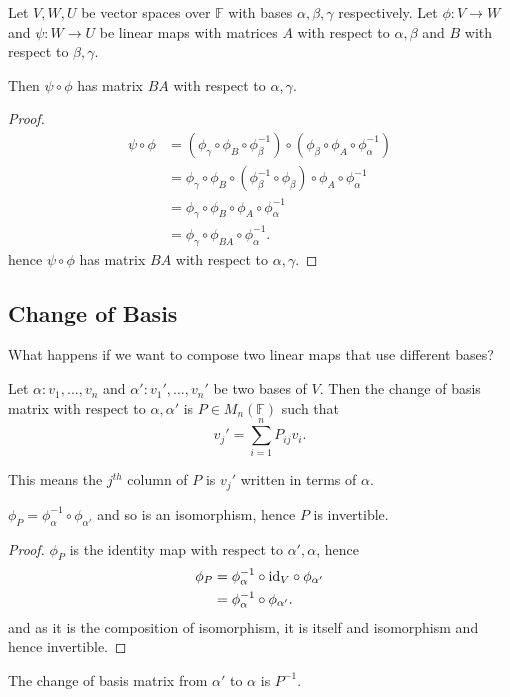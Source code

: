 \begin{prop}
    Let $V, W , U$ be vector spaces over $\mathbb{F}$ with bases $\alpha, \beta, \gamma$ respectively. Let $\phi : V \rightarrow W$ and $\psi : W \rightarrow U$ be linear maps with matrices $A$ with respect to $\alpha, \beta$ and $B$ with respect to $\beta,\gamma$.

    Then $\psi \circ \phi$ has matrix $BA$ with respect to $\alpha, \gamma$.
\end{prop}
\begin{proof}
  \begin{align*}
    \psi \circ \phi &= (\phi_\gamma \circ \phi_B \circ \phi_\beta^{-1}) \circ (\phi_\beta \circ \phi_A \circ \phi_\alpha^{-1}) \\
    &= \phi_\gamma \circ \phi_B \circ (\phi_\beta^{-1} \circ \phi_\beta) \circ \phi_A \circ \phi_\alpha^{-1} \\
    &= \phi_\gamma \circ \phi_B \circ  \phi_A \circ \phi_\alpha^{-1} \\
    &= \phi_\gamma \circ \phi_{BA} \circ \phi_\alpha^{-1}
  .\end{align*}
  hence $\psi \circ \phi$ has matrix $BA$ with respect to $\alpha, \gamma$.

\end{proof}

\subsection{Change of Basis}

What happens if we want to compose two linear maps that use different bases?

\begin{definition}
    Let $\alpha : v_1,...,v_n$ and $\alpha' : v_1',..., v_n'$ be two bases of $V$. Then the change of basis matrix with respect to $\alpha, \alpha'$ is $P \in M_n(\mathbb{F})$ such that
    \[v_j' = \sum_{i = 1}^n P_{ij} v_i.\]

    This means the $j^{th}$ column of $P$ is $v_j'$ written in terms of $\alpha$.
\end{definition}

\begin{lemma}
  $\phi_P = \phi_\alpha^{-1} \circ \phi_{\alpha'}$ and so is an isomorphism, hence $P$ is invertible.
\end{lemma}
\begin{proof}
    $\phi_P$ is the identity map with respect to $\alpha', \alpha$, hence
    \begin{align*}
      \phi_P &= \phi_\alpha^{-1} \circ \mathrm{id}_V \circ \phi_{\alpha'} \\
             &= \phi_\alpha^{-1} \circ \phi_{\alpha'}
    .\end{align*}
    and as it is the composition of isomorphism, it is itself and isomorphism and hence invertible.
\end{proof}
\begin{corollary}
  The change of basis matrix from $\alpha'$ to $\alpha$ is $P^{-1}$.
\end{corollary}

